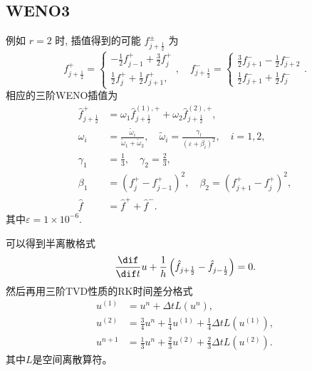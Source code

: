 \documentclass[12pt]{article}
\begin{document}
\subsection{WENO3}

例如 $r=2$ 时, 插值得到的可能 $f_{j+\frac{1}{2}}^{\pm}$ 为
\begin{equation}
	f_{j+\frac{1}{2}}^{+}=\left\{\begin{array}{l}
		-\frac{1}{2} f_{j-1}^{+}+\frac{3}{2} f_{j}^{+} \\
		\frac{1}{2} f_{j}^{+}+\frac{1}{2} f_{j+1}^{+},
	\end{array}, \quad f_{j+\frac{1}{2}}^{-}=\left\{\begin{array}{l}
		\frac{3}{2} f_{j+1}^{-}-\frac{1}{2} f_{j+2}^{-} \\
		\frac{1}{2} f_{j+1}^{-}+\frac{1}{2} f_{j}^{-}
	\end{array}\right.\right..
\end{equation}
相应的三阶WENO插值为
\begin{align}
	\hat{f}_{j+\frac{1}{2}}^{+} & =\omega_{1} \hat{f}_{j+\frac{1}{2}}^{(1),+}+\omega_{2} \hat{f}_{j+\frac{1}{2}}^{(2),+}                 ,                                                                            \\
	\omega_{i}                  & =\frac{\widetilde{\omega}_{i}}{\widetilde{\omega}_{1}+\widetilde{\omega}_{2}}, \quad \widetilde{\omega}_{i}=\frac{\gamma_{l}}{\left(\varepsilon+\beta_{i}\right)^{2}}, \quad i=1,2, \\
	\gamma_{1}                  & =\frac{1}{3}, \quad \gamma_{2}=\frac{2}{3},                                                                                                                                         \\
	\beta_{1}                   & =\left(f_{j}^{+}-f_{j-1}^{+}\right)^{2}, \quad \beta_{2}=\left(f_{j+1}^{+}-f_{j}^{+}\right)^{2},                                                                                    \\
	\hat{f}                     & =\hat{f}^+ + \hat{f}^-.
\end{align}
其中$\varepsilon = 1\times 10^{-6}$.

可以得到半离散格式
\begin{equation}
	\frac{\dif}{\dif t}u + \frac{1}{h}\left(\hat{f}_{j+\frac{1}{2}}-\hat{f}_{j-\frac{1}{2}}\right)=0.
\end{equation}
然后再用三阶TVD性质的RK时间差分格式
\begin{equation}
	\begin{aligned}
		{u}^{(1)} & ={u}^{n}+\Delta t L\left({u}^{n}\right)    ,                                             \\
		{u}^{(2)} & =\frac{3}{4} {u}^{n}+\frac{1}{4} {u}^{(1)}+\frac{1}{4} \Delta t L\left({u}^{(1)}\right), \\
		{u}^{n+1} & =\frac{1}{3} {u}^{n}+\frac{2}{3} {u}^{(2)}+\frac{2}{3} \Delta t L\left({u}^{(2)}\right).
	\end{aligned}
	\label{eq:11}
\end{equation}
其中$L$是空间离散算符。
\end{document}
